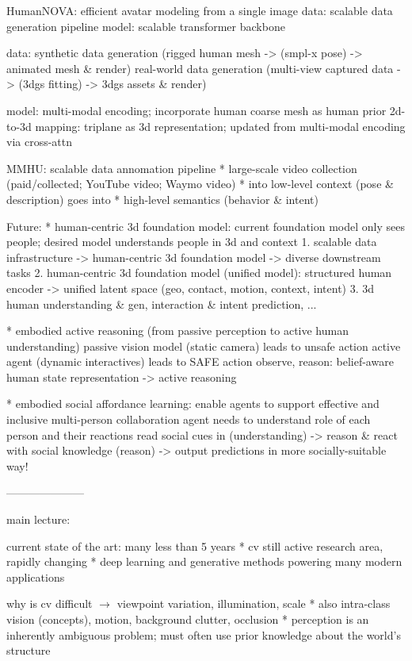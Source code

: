 \documentclass[11pt, oneside]{book}
\begin{document}
HumanNOVA: efficient avatar modeling from a single image
data: scalable data generation pipeline
model: scalable transformer backbone

data: synthetic data generation (rigged human mesh -> (smpl-x pose) -> animated mesh \& render)
real-world data generation (multi-view captured data -> (3dgs fitting) -> 3dgs assets \& render)

model: multi-modal encoding; incorporate human coarse mesh as human prior
2d-to-3d mapping: triplane as 3d representation; updated from multi-modal encoding via cross-attn

MMHU: scalable data annomation pipeline
* large-scale video collection (paid/collected; YouTube video; Waymo video)
* into low-level context (pose \& description) goes into
* high-level semantics (behavior \& intent)

Future:
* human-centric 3d foundation model: current foundation model only sees people;
desired model understands people in 3d and context
1. scalable data infrastructure -> human-centric 3d foundation model -> diverse downstream tasks
2. human-centric 3d foundation model (unified model): structured human encoder -> unified latent space (geo, contact, motion, context, intent)
3. 3d human understanding \& gen, interaction \& intent prediction, ...

* embodied active reasoning (from passive perception to active human understanding)
passive vision model (static camera) leads to unsafe action
active agent (dynamic interactives) leads to SAFE action
observe, reason: belief-aware human state representation -> active reasoning

* embodied social affordance learning: enable agents to support effective and inclusive multi-person collaboration
agent needs to understand role of each person and their reactions
read social cues in (understanding) -> reason \& react with social knowledge (reason) -> output predictions in more socially-suitable way!

---------------------

main lecture:

current state of the art: many less than 5 years
* cv still active research area, rapidly changing
* deep learning and generative methods powering many modern applications

why is cv difficult $\rightarrow$ viewpoint variation, illumination, scale
* also intra-class vision (concepts), motion, background clutter, occlusion
* perception is an inherently ambiguous problem; must often use prior knowledge about the world's structure
\end{document}
